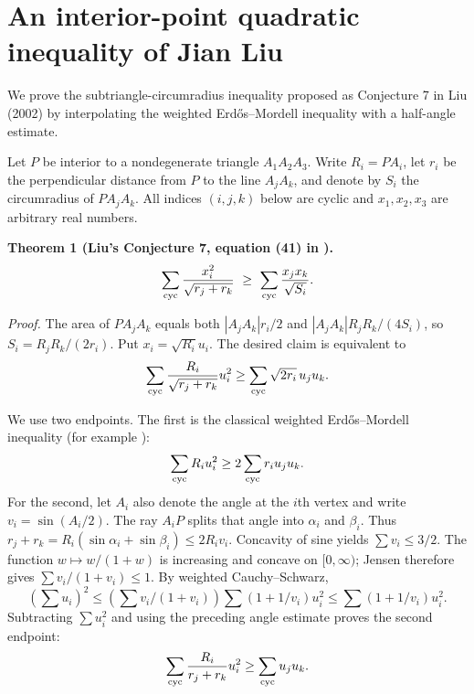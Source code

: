 \documentclass[11pt,a4paper]{article}
\numberwithin{equation}{section}
\theoremstyle{definition}
\theoremstyle{remark}
\newenvironment{sectionabstract}{\par\smallskip\begingroup\small\noindent}{\par\endgroup\medskip}
\begin{document}
\par\endgroup

\begingroup
\newcommand{\cy}{\sum_{\rm cyc}}
\section{\texorpdfstring{An interior-point quadratic inequality of Jian Liu}{An interior-point quadratic inequality of Jian Liu}}\label{section:r42keio}
\par\medskip


\begin{sectionabstract}
We prove the subtriangle-circumradius inequality proposed as Conjecture 7 in Liu (2002) by interpolating the weighted Erd\H os--Mordell inequality with a half-angle estimate. 
\end{sectionabstract}
Let $P$ be interior to a nondegenerate triangle $A_1A_2A_3$. Write $R_i=PA_i$, let $r_i$ be the perpendicular distance from $P$ to the line $A_jA_k$, and denote by $S_i$ the circumradius of $PA_jA_k$. All indices $(i,j,k)$ below are cyclic and $x_1,x_2,x_3$ are arbitrary real numbers.

\textbf{Theorem 1 (Liu's Conjecture 7, equation (41) in \cite{r42keio:source}).}
\[
 \cy\frac{x_i^2}{\sqrt{r_j+r_k}}\ \ge\ \cy\frac{x_jx_k}{\sqrt{S_i}}.
\]

\emph{Proof.} The area of $PA_jA_k$ equals both $|A_jA_k|r_i/2$ and $|A_jA_k|R_jR_k/(4S_i)$, so $S_i=R_jR_k/(2r_i)$. Put $x_i=\sqrt{R_i}u_i$. The desired claim is equivalent to
\begin{equation}
 \cy\frac{R_i}{\sqrt{r_j+r_k}}u_i^2\ge\cy\sqrt{2r_i}\,u_ju_k.
 \label{r42keio:eq:main}
\end{equation}

We use two endpoints. The first is the classical weighted Erd\H os--Mordell inequality (for example \cite[Thm.~1.2]{r42keio:jiang}):
\begin{equation}
 \cy R_i u_i^2\ge 2\cy r_i u_ju_k.\label{r42keio:eq:a}
\end{equation}
For the second, let $A_i$ also denote the angle at the $i$th vertex and write $v_i=\sin(A_i/2)$. The ray $A_iP$ splits that angle into $\alpha_i$ and $\beta_i$. Thus $r_j+r_k=R_i(\sin\alpha_i+\sin\beta_i)\le2R_i v_i$. Concavity of sine yields $\sum v_i\le3/2$. The function $w\mapsto w/(1+w)$ is increasing and concave on $[0,\infty)$; Jensen therefore gives $\sum v_i/(1+v_i)\le1$. By weighted Cauchy--Schwarz,
\[
 (\textstyle\sum u_i)^2\le\left(\sum v_i/(1+v_i)\right)\sum(1+1/v_i)u_i^2
 \le\sum (1+1/v_i)u_i^2.
\]
Subtracting $\sum u_i^2$ and using the preceding angle estimate proves the second endpoint:
\begin{equation}
 \cy\frac{R_i}{r_j+r_k}u_i^2\ge\cy u_ju_k.\label{r42keio:eq:b}
\end{equation}
\end{document}
